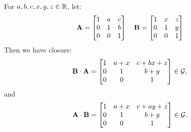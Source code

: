 \documentclass[11pt]{article}
\begin{document}
\begin{enumerate}
          For $a, b, c, x, y, z \in \mathbb{R}$, let:
          \[
              \mathbf{A} =
              \begin{bmatrix}
                  1 & a & c \\
                  0 & 1 & b \\
                  0 & 0 & 1
              \end{bmatrix}
              \quad
              \mathbf{B} =
              \begin{bmatrix}
                  1 & x & z \\
                  0 & 1 & y \\
                  0 & 0 & 1
              \end{bmatrix}
          \]
          Then we have closure:
          \[
              \mathbf{B} \cdot \mathbf{A} =
              \begin{bmatrix}
                  1 & a + x & c + bx + z \\
                  0 & 1     & b + y      \\
                  0 & 0     & 1
              \end{bmatrix}
              \in \mathcal{G},
          \]
          and
          \[
              \mathbf{A} \cdot \mathbf{B} =
              \begin{bmatrix}
                  1 & a + x & c + ay + z \\
                  0 & 1     & b + y      \\
                  0 & 0     & 1
              \end{bmatrix}
              \in \mathcal{G}.
          \]


\end{enumerate}
\end{document}
